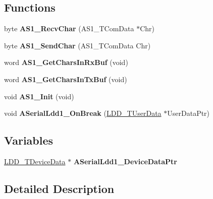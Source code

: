 \subsection*{Functions}
\begin{DoxyCompactItemize}
\item 
byte {\bfseries A\+S1\+\_\+\+Recv\+Char} (A\+S1\+\_\+\+T\+Com\+Data $\ast$Chr)\hypertarget{group___a_s1__module_ga9b8f8ba49f2260fa77c5dc04d6d0b19c}{}\label{group___a_s1__module_ga9b8f8ba49f2260fa77c5dc04d6d0b19c}

\item 
byte {\bfseries A\+S1\+\_\+\+Send\+Char} (A\+S1\+\_\+\+T\+Com\+Data Chr)\hypertarget{group___a_s1__module_gadd3d17688519945b315fcc55a5459f92}{}\label{group___a_s1__module_gadd3d17688519945b315fcc55a5459f92}

\item 
word {\bfseries A\+S1\+\_\+\+Get\+Chars\+In\+Rx\+Buf} (void)\hypertarget{group___a_s1__module_ga7f982fbc183fdc49ae898b0cc9a05b4d}{}\label{group___a_s1__module_ga7f982fbc183fdc49ae898b0cc9a05b4d}

\item 
word {\bfseries A\+S1\+\_\+\+Get\+Chars\+In\+Tx\+Buf} (void)\hypertarget{group___a_s1__module_gada23618356da6913f8709b30d4defef6}{}\label{group___a_s1__module_gada23618356da6913f8709b30d4defef6}

\item 
void {\bfseries A\+S1\+\_\+\+Init} (void)\hypertarget{group___a_s1__module_ga38b6ab56f67ae07e420858f55a8aa7a1}{}\label{group___a_s1__module_ga38b6ab56f67ae07e420858f55a8aa7a1}

\item 
void {\bfseries A\+Serial\+Ldd1\+\_\+\+On\+Break} (\hyperlink{group___p_e___types__module_ga0b66a73f87238a782318aa0be7578e35}{L\+D\+D\+\_\+\+T\+User\+Data} $\ast$User\+Data\+Ptr)\hypertarget{group___a_s1__module_gaff0fe796ad334f68b2a86273f5ade786}{}\label{group___a_s1__module_gaff0fe796ad334f68b2a86273f5ade786}

\end{DoxyCompactItemize}
\subsection*{Variables}
\begin{DoxyCompactItemize}
\item 
\hyperlink{group___p_e___types__module_gac5cf1362f1f0e3a2ce71b1bf2276d091}{L\+D\+D\+\_\+\+T\+Device\+Data} $\ast$ {\bfseries A\+Serial\+Ldd1\+\_\+\+Device\+Data\+Ptr}\hypertarget{group___a_s1__module_ga19d4b715e209f6228d76c65b3d3e13b1}{}\label{group___a_s1__module_ga19d4b715e209f6228d76c65b3d3e13b1}

\end{DoxyCompactItemize}


\subsection{Detailed Description}
